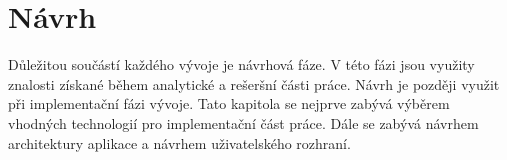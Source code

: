 \chapter{Návrh}\label{kapitola-navrh}
Důležitou součástí každého vývoje je návrhová fáze. V této fázi jsou využity znalosti získané během analytické a rešeršní části práce. Návrh je později využit při implementační fázi vývoje. Tato kapitola se nejprve zabývá výběrem vhodných technologií pro implementační část práce.
Dále se zabývá návrhem architektury aplikace a návrhem uživatelského rozhraní.



